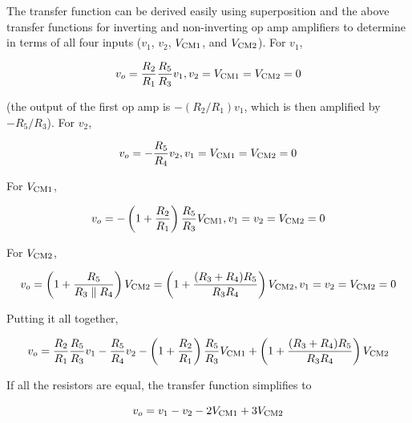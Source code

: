 The transfer function can be derived easily using superposition and the above transfer functions for inverting and non-inverting op amp amplifiers to determine \vout in terms of all four inputs ($v_1$, $v_2$, $V_\mathrm{CM1}$, and $V_\mathrm{CM2}$).
For $v_1$,

\begin{equation}
v_o = \frac{R_2}{R_1}\frac{R_5}{R_3}v_1, v_2 = V_\mathrm{CM1} = V_\mathrm{CM2} = 0
\end{equation}

\noindent (the output of the first op amp is $-(R_2/R_1)v_1$, which is then amplified by $-R_5/R_3$).
For $v_2$,

\begin{equation}
v_o = -\frac{R_5}{R_4}v_2, v_1 = V_\mathrm{CM1} = V_\mathrm{CM2} = 0
\end{equation}

\noindent For $V_\mathrm{CM1}$,

\begin{equation}
v_o = -\left(1+\frac{R_2}{R_1}\right)\frac{R_5}{R_3}V_\mathrm{CM1}, v_{1} = v_{2} = V_\mathrm{CM2} = 0
\end{equation}

\noindent For $V_\mathrm{CM2}$,

\begin{equation}
v_o = \left(1+\frac{R_5}{R_3 \parallel R_4}\right)V_\mathrm{CM2} = \left(1+\frac{(R_3+R_4)R_5}{R_3R_4}\right)V_\mathrm{CM2}, v_1 = v_2 = V_\mathrm{CM2} = 0
\end{equation}

\noindent Putting it all together,

\textcolor{red}{
\begin{equation}
v_o = \frac{R_2}{R_1}\frac{R_5}{R_3}v_1 - \frac{R_5}{R_4}v_2 - \left(1+\frac{R_2}{R_1}\right)\frac{R_5}{R_3}V_\mathrm{CM1} + \left(1+\frac{(R_3+R_4)R_5}{R_3R_4}\right)V_\mathrm{CM2}
\label{eq:highcmdifferenceamplifier}
\end{equation}
}

\noindent If all the resistors are equal, the transfer function simplifies to

\textcolor{red}{
\begin{equation}
v_o = v_1-v_2-2V_\mathrm{CM1}+3V_\mathrm{CM2}
\label{eq:highcmdifferenceamplifier_simple}
\end{equation}
}

